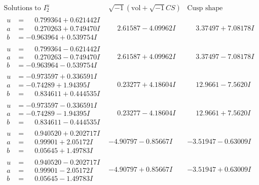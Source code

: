 \documentclass[1p]{elsarticle_modified}
\theoremstyle{definition}
\newcommand{\I}{\sqrt{-1}}
\begin{document}
$$\begin{array}{c|c|c}  
\text{Solutions to }I^u_{2}& \I (\text{vol} + \sqrt{-1}CS) & \text{Cusp shape}\\
 \hline 
\begin{aligned}
u &= \phantom{-}0.799364 + 0.621442 I \\
a &= \phantom{-}0.270263 + 0.749470 I \\
b &= -0.963964 + 0.539754 I\end{aligned}
 & \phantom{-}2.61587 - 4.09962 I & \phantom{-}3.37497 + 7.08178 I \\ \hline\begin{aligned}
u &= \phantom{-}0.799364 - 0.621442 I \\
a &= \phantom{-}0.270263 - 0.749470 I \\
b &= -0.963964 - 0.539754 I\end{aligned}
 & \phantom{-}2.61587 + 4.09962 I & \phantom{-}3.37497 - 7.08178 I \\ \hline\begin{aligned}
u &= -0.973597 + 0.336591 I \\
a &= -0.74289 + 1.94395 I \\
b &= \phantom{-}0.834611 + 0.444535 I\end{aligned}
 & \phantom{-}0.23277 + 4.18604 I & \phantom{-}12.9661 - 7.5620 I \\ \hline\begin{aligned}
u &= -0.973597 - 0.336591 I \\
a &= -0.74289 - 1.94395 I \\
b &= \phantom{-}0.834611 - 0.444535 I\end{aligned}
 & \phantom{-}0.23277 - 4.18604 I & \phantom{-}12.9661 + 7.5620 I \\ \hline\begin{aligned}
u &= \phantom{-}0.940520 + 0.202717 I \\
a &= \phantom{-}0.99901 + 2.05172 I \\
b &= \phantom{-}0.05645 + 1.49783 I\end{aligned}
 & -4.90797 - 0.85667 I & -3.51947 - 0.63009 I \\ \hline\begin{aligned}
u &= \phantom{-}0.940520 - 0.202717 I \\
a &= \phantom{-}0.99901 - 2.05172 I \\
b &= \phantom{-}0.05645 - 1.49783 I\end{aligned}
 & -4.90797 + 0.85667 I & -3.51947 + 0.63009 I \\ \hline\begin{aligned}

\end{aligned}
\end{array}$$
\end{document}
